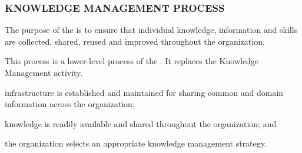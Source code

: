 		\subsubsection{KNOWLEDGE MANAGEMENT PROCESS\label{llproc:knowledge_management_process}}

			\begin{adjustwidth}{2em}{0pt} 

				The purpose of the  is to ensure that individual knowledge, information and skills are collected, shared, reused and improved throughout the organization.

				This process is a lower-level process of the . It replaces the Knowledge Management activity.

			\end{adjustwidth}

			\begin{adjustwidth}{2em}{0pt} 

				\begin{compactitem}

					\item infrastructure is established and maintained for sharing common and domain information across the organization;

					\item knowledge is readily available and shared throughout the organization; and

					\item the organization selects an appropriate knowledge management strategy.

				\end{compactitem}

			\end{adjustwidth}


	\newpage
